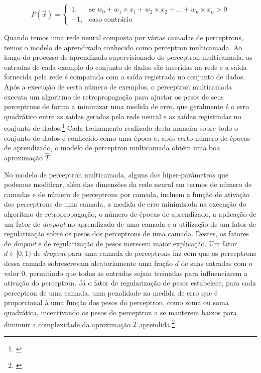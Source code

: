 \begin{equation} \label{eq:perceptron}
  P(\vec{x}) =
  \begin{cases}
    1, & \text{se } w_{0} + w_{1} \times x_{1} + w_{2} \times x_{2} + ... + w_{n} \times x_{n} > 0\\
    -1, & \text{caso contrário}
  \end{cases}
\end{equation}

Quando temos uma rede neural composta por várias camadas de perceptrons, temos o modelo de aprendizado conhecido como perceptron multicamada. Ao longo do processo de aprendizado supervisionado do perceptron multicamada, as entradas de cada exemplo do conjunto de dados são inseridas na rede e a saída fornecida pela rede é comparada com a saída registrada no conjunto de dados. Após a execução de certo número de exemplos, o perceptron multicamada executa um algoritmo de retropropagação para ajustar os pesos de seus perceptrons de forma a minimizar uma medida de erro, que geralmente é o erro quadrático entre as saídas geradas pela rede neural e as saídas registradas no conjunto de dados.\footnote{\cite[p.97]{machine_learning}} Cada treinamento realizado desta maneira sobre todo o conjunto de dados é conhecido como uma época e, após certo número de épocas de aprendizado, o modelo de perceptron multicamada obtém uma boa aproximação $\hat{T}$.

No modelo de perceptron multicamada, alguns dos hiper-parâmetros que podemos modificar, além das dimensões da rede neural em termos de número de camadas e de número de perceptrons por camada, incluem a função de ativação dos perceptrons de uma camada, a medida de erro minimizada na execução do algoritmo de retropropagação, o número de épocas de aprendizado, a aplicação de um fator de \textit{dropout} no aprendizado de uma camada e a utilização de um fator de regularização sobre os pesos dos perceptrons de uma camada. Destes, os fatores de \textit{dropout} e de regularização de pesos merecem maior explicação. Um fator $d \in [0, 1)$ de \textit{dropout} para uma camada de perceptrons faz com que os perceptrons dessa camada sobrescrevam aleatoriamente uma fração $d$ de suas entradas com o valor 0, permitindo que todas as entradas sejam treinadas para influenciarem a ativação do perceptron. Já o fator de regularização de pesos estabelece, para cada perceptron de uma camada, uma penalidade na medida de erro que é proporcional à uma função dos pesos do perceptron, como soma ou soma quadrática, incentivando os pesos do perceptron a se manterem baixos para diminuir a complexidade da aproximação $\hat{T}$ aprendida.\footnote{\cite[p.111]{machine_learning}}

